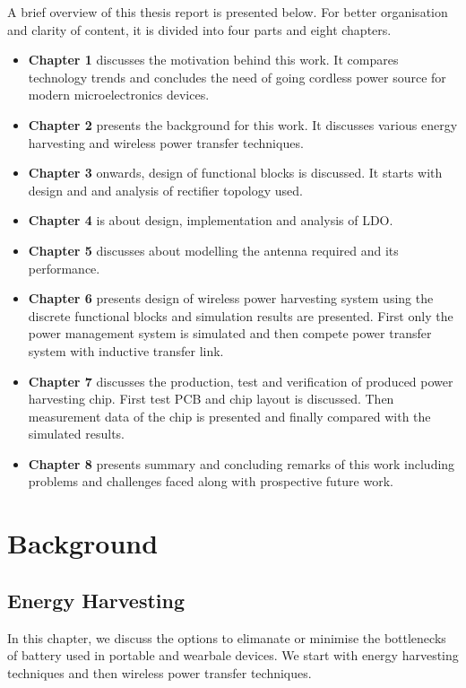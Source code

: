 \documentclass[UKenglish]{ifimaster}  %
\begin{document}
A brief overview of this thesis report is presented below. For better organisation and clarity of content, it is divided into four parts 
and eight chapters. 
\begin{itemize}
\item \textbf{Chapter 1} discusses the motivation behind this work. It compares technology trends and concludes
the need of going cordless power source for modern microelectronics devices.
\item \textbf{Chapter 2} presents the background for this work. It discusses various energy harvesting and 
wireless power transfer techniques.
\item \textbf{Chapter 3} onwards, design of functional blocks is discussed. It starts with design and 
and analysis of rectifier topology used.
\item \textbf{Chapter 4} is about design, implementation and analysis of LDO.
\item \textbf{Chapter 5} discusses about modelling the antenna required and its performance. 
\item \textbf{Chapter 6} presents design of wireless power harvesting system using the discrete functional blocks and simulation 
results are presented. First only the power management system is simulated and then compete power transfer system with 
inductive transfer link.
\item \textbf{Chapter 7} discusses the production, test and verification of produced power harvesting chip. First test PCB and 
chip layout is discussed. Then measurement data of the chip is presented and finally compared with the simulated results.
\item \textbf{Chapter 8} presents summary and concluding remarks of this work including problems and challenges faced 
along with prospective future work.

\end{itemize}




\chapter{Background}

\section{Energy Harvesting}

In this chapter, we discuss the options to elimanate or minimise the bottlenecks of battery used in portable and 
wearbale devices. We start with energy harvesting techniques and then wireless power transfer techniques. \\
\end{document}
